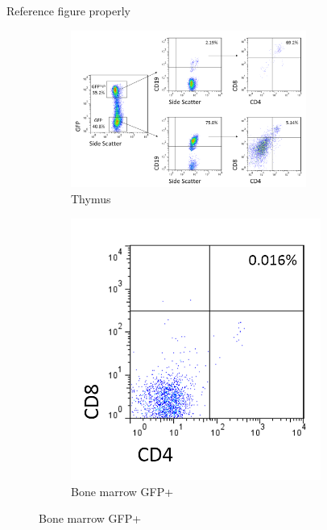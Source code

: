 Reference figure properly

\begin{figure}	
	\begin{subfigure}{\textwidth}
	\centering
	\includegraphics[width=0.85\textwidth]{Figures/GFPCD19CD4CD8.png}
	\caption{Thymus}
	\label{subfig:ThyRAGCD19DP}
	\end{subfigure}
	\begin{subfigure}{0.3\textwidth}
	\centering
	\includegraphics[width=0.9\textwidth]{Figures/BMallposGFPpos.png}
	\caption{Bone marrow GFP+}
	\label{subfig:BMRAGCD19DP}
	\end{subfigure}
	\hfill

\end{figure}
